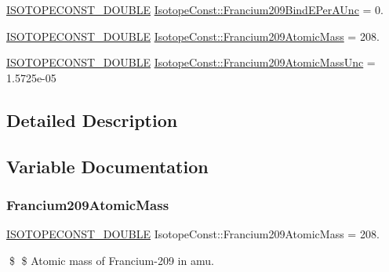 \begin{DoxyCompactItemize}
\mbox{\hyperlink{group___isotope_const-_macros_ga8f45a7272ce02c0b4c65c44636ed719a}{I\+S\+O\+T\+O\+P\+E\+C\+O\+N\+S\+T\+\_\+\+D\+O\+U\+B\+LE}} \mbox{\hyperlink{group___isotope_const-_francium-_fr209_ga0dd43735907b766e09ddf06c84554c24}{Isotope\+Const\+::\+Francium209\+Bind\+E\+Per\+A\+Unc}} = 0.
\item 
\mbox{\hyperlink{group___isotope_const-_macros_ga8f45a7272ce02c0b4c65c44636ed719a}{I\+S\+O\+T\+O\+P\+E\+C\+O\+N\+S\+T\+\_\+\+D\+O\+U\+B\+LE}} \mbox{\hyperlink{group___isotope_const-_francium-_fr209_gaa0601a0d6aab9ed84f16dd5c4d93c460}{Isotope\+Const\+::\+Francium209\+Atomic\+Mass}} = 208.
\item 
\mbox{\hyperlink{group___isotope_const-_macros_ga8f45a7272ce02c0b4c65c44636ed719a}{I\+S\+O\+T\+O\+P\+E\+C\+O\+N\+S\+T\+\_\+\+D\+O\+U\+B\+LE}} \mbox{\hyperlink{group___isotope_const-_francium-_fr209_gae5e4d6cfb04b34267bd95d5d2e1888bf}{Isotope\+Const\+::\+Francium209\+Atomic\+Mass\+Unc}} = 1.\+5725e-\/05
\end{DoxyCompactItemize}


\subsection{Detailed Description}


\subsection{Variable Documentation}
\mbox{\label{group___isotope_const-_francium-_fr209_gaa0601a0d6aab9ed84f16dd5c4d93c460}} 
\subsubsection{\texorpdfstring{Francium209\+Atomic\+Mass}{Francium209AtomicMass}}
{\footnotesize\ttfamily \mbox{\hyperlink{group___isotope_const-_macros_ga8f45a7272ce02c0b4c65c44636ed719a}{I\+S\+O\+T\+O\+P\+E\+C\+O\+N\+S\+T\+\_\+\+D\+O\+U\+B\+LE}} Isotope\+Const\+::\+Francium209\+Atomic\+Mass = 208.}

\$ \$ Atomic mass of Francium-\/209 in amu. \mbox{\label{group___isotope_const-_francium-_fr209_gae5e4d6cfb04b34267bd95d5d2e1888bf}} 
